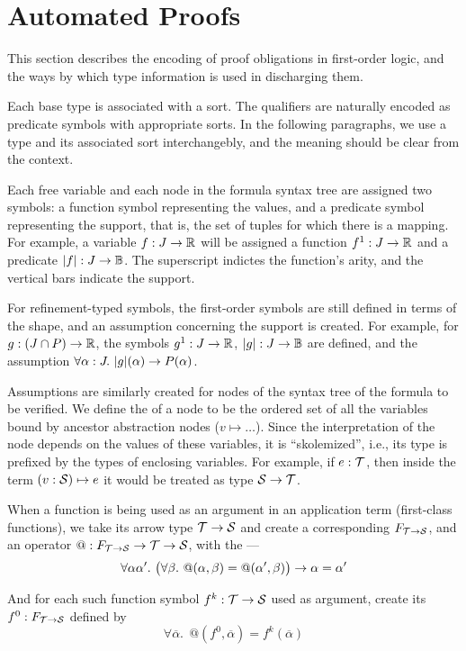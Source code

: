 \section{Automated Proofs}

This section describes the encoding of proof obligations in first-order logic,
and the ways by which type information is used in discharging them.

Each base type is associated with a sort. The qualifiers are naturally encoded
as predicate symbols with appropriate sorts. In the following paragraphs, we
use a type and its associated sort interchangebly, and the meaning should be clear
from the context.

Each free variable and each node in the formula syntax tree are assigned two
symbols: a function symbol representing the values, and a predicate symbol
representing the support, that is, the set of tuples for which there is a mapping.
For example, a variable $f : J\to\R$ will be assigned a function $f^1: J\to\R$
and a predicate $|f|: J\to\B$. The superscript indictes the function's arity,
and the vertical bars indicate the support.

For refinement-typed symbols, the first-order symbols are still defined in terms
of the shape, and an assumption concerning the support is created. For example,
for $g: (J\cap P)\to\R$, the symbols $g^1:J\to\R$, $|g|:J\to\B$ are defined,
and the assumption $\forall \alpha:J.~|g|(\alpha)\limplies P(\alpha)$.

Assumptions are similarly created for nodes of the syntax tree of the formula to
be verified. We define the  of a node to be the ordered set of
all the variables bound by ancestor abstraction nodes ($v\mapsto\ldots$). Since
the interpretation of the node depends on the values of these variables, it is
``skolemized'', i.e., its type is prefixed by the types of enclosing variables.
For example, if $e:\T$, then inside the term $(v:\S)\mapsto e$ it would be treated as
type $\S\to\T$.

When a function is being used as an argument in an application term (first-class functions), 
we take its arrow type $\T\to\S$ and create a corresponding  $F_{\T\to\S}$,
and an operator $@ : F_{\T\to\S}\to\T\to\S$, with the  ---
\begin{equation}
\forall \alpha\alpha'.~ \big(\forall\beta.~ @(\alpha,\beta)=@(\alpha',\beta)\big)\limplies \alpha=\alpha'
\label{automated:extensionality}
\end{equation}

And for each such function symbol $f^k:\T\to\S$ used as argument, create its 
 $f^0:F_{\T\to\S}$ defined by
\begin{equation}
\forall \overline\alpha.~~@(f^0,\overline\alpha)=f^k(\overline\alpha)
\label{automated:reflection}
\end{equation}
